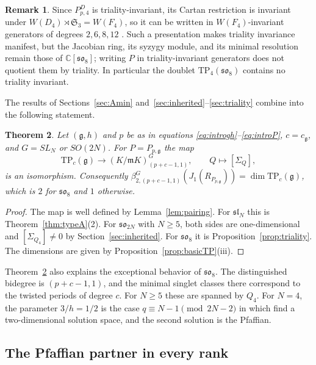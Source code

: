 \documentclass[10pt,reqno]{amsart}
\numberwithin{equation}{section}
\theoremstyle{plain}
\newtheorem{theorem}{Theorem}[section]
\theoremstyle{definition}
\newtheorem{remark}[theorem]{Remark}
\newcommand{\Sym}{\mathfrak{S}}
\newcommand{\TP}{\mathrm{TP}}
\begin{document}
\begin{remark}\label{rem:F4}
Since $P^D_{p,4}$ is triality-invariant, its Cartan restriction is invariant under $W(D_4)\rtimes\Sym_3=W(F_4)$, so it can be written in $W(F_4)$-invariant generators of degrees $2,6,8,12$ \cite{Humphreys}. Such a presentation makes triality invariance manifest, but the Jacobian ring, its syzygy module, and its minimal resolution remain those of $\mathbb{C}[\mathfrak{so}_8]$; writing $P$ in triality-invariant generators does not quotient them by triality. In particular the doublet $\TP_4(\mathfrak{so}_8)$ contains no triality invariant.
\end{remark}

The results of Sections~\ref{sec:Amin} and~\ref{sec:inherited}--\ref{sec:triality} combine into the following statement.

\begin{theorem}\label{thm:TPform}
Let $(\mathfrak{g},h)$ and $p$ be as in equations \eqref{eq:introgh}--\eqref{eq:introP}, $c=c_\mathfrak{g}$, and $G=SL_N$ or $SO(2N)$. For $P=P_{p,\mathfrak{g}}$ the map
\begin{equation}
	\TP_c(\mathfrak{g})\longrightarrow(K/\mathfrak{m} K)^G_{(p+c-1,1)},\qquad Q\longmapsto[\Sigma_Q],
\end{equation}
is an isomorphism. Consequently $\beta^G_{2,(p+c-1,1)}(J_1(R_{P_{p,\mathfrak{g}}}))=\dim\TP_c(\mathfrak{g})$, which is $2$ for $\mathfrak{so}_8$ and $1$ otherwise.
\end{theorem}

\begin{proof}
The map is well defined by Lemma~\ref{lem:pairing}. For $\mathfrak{sl}_N$ this is Theorem~\ref{thm:typeA}(2). For $\mathfrak{so}_{2N}$ with $N\ge5$, both sides are one-dimensional and $[\Sigma_{Q_4}]\neq0$ by Section~\ref{sec:inherited}. For $\mathfrak{so}_8$ it is Proposition~\ref{prop:triality}. The dimensions are given by Proposition~\ref{prop:basicTP}(iii).
\end{proof}

Theorem~\ref{thm:TPform} also explains the exceptional behavior of $\mathfrak{so}_8$. The distinguished bidegree is $(p+c-1,1)$, and the minimal singlet classes there correspond to the twisted periods of degree $c$. For $N\ge5$ these are spanned by $Q_4$. For $N=4$, the parameter $3/h=1/2$ is the case $q\equiv N-1\pmod{2N-2}$ in which \cite{FS} find a two-dimensional solution space, and the second solution is the Pfaffian.

\subsection{The Pfaffian partner in every rank}
\end{document}
